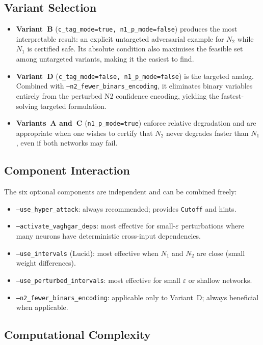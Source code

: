 \documentclass[11pt,a4paper]{article}
\theoremstyle{definition}
\theoremstyle{plain}
\newcommand{\NN}[1]{N_{#1}}
\newcommand{\eps}{\varepsilon}
\begin{document}
\subsection{Variant Selection}

\begin{itemize}
  \item \textbf{Variant~B} (\texttt{c\_tag\_mode=true, n1\_p\_mode=false}) produces the most interpretable result: an explicit untargeted adversarial example for $\NN{2}$ while $\NN{1}$ is certified safe. Its absolute condition also maximises the feasible set among untargeted variants, making it the easiest to find.
  \item \textbf{Variant~D} (\texttt{c\_tag\_mode=false, n1\_p\_mode=false}) is the targeted analog. Combined with \texttt{--n2\_fewer\_binars\_encoding}, it eliminates binary variables entirely from the perturbed N2 confidence encoding, yielding the fastest-solving targeted formulation.
  \item \textbf{Variants~A and~C} (\texttt{n1\_p\_mode=true}) enforce relative degradation and are appropriate when one wishes to certify that $\NN{2}$ never degrades faster than $\NN{1}$, even if both networks may fail.
\end{itemize}

\subsection{Component Interaction}

The six optional components are independent and can be combined freely:
\begin{itemize}
  \item \texttt{--use\_hyper\_attack}: always recommended; provides \texttt{Cutoff} and hints.
  \item \texttt{--activate\_vaghgar\_deps}: most effective for small-$\eps$ perturbations where many neurons have deterministic cross-input dependencies.
  \item \texttt{--use\_intervals} (Lucid): most effective when $\NN{1}$ and $\NN{2}$ are close (small weight differences).
  \item \texttt{--use\_perturbed\_intervals}: most effective for small $\eps$ or shallow networks.
  \item \texttt{--n2\_fewer\_binars\_encoding}: applicable only to Variant~D; always beneficial when applicable.
\end{itemize}

\subsection{Computational Complexity}
\end{document}
